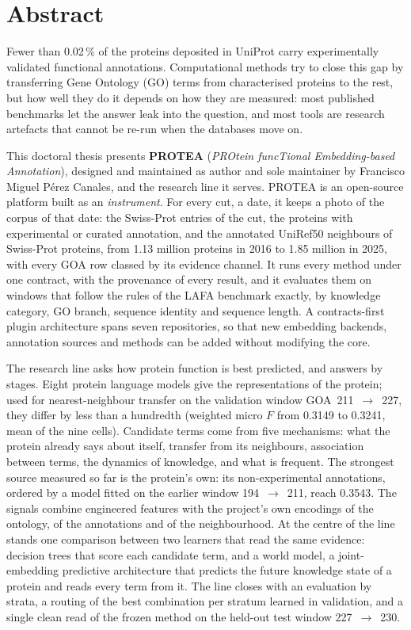 \chapter*{Abstract}

Fewer than 0.02\,\% of the proteins deposited in UniProt carry experimentally
validated functional annotations. Computational methods try to close this gap by
transferring Gene Ontology (GO) terms from characterised proteins to the rest, but how
well they do it depends on how they are measured: most published benchmarks let the
answer leak into the question, and most tools are research artefacts that cannot be
re-run when the databases move on.

This doctoral thesis presents \textbf{PROTEA} (\textit{PROtein funcTional
Embedding-based Annotation}), designed and maintained as author and sole maintainer by
Francisco Miguel P\'{e}rez Canales, and the research line it serves. PROTEA is an
open-source platform built as an \emph{instrument}. For every cut, a date, it keeps a
photo of the corpus of that date: the Swiss-Prot entries of the cut, the proteins with
experimental or curated annotation, and the annotated UniRef50 neighbours of Swiss-Prot
proteins, from 1.13 million proteins in 2016 to 1.85 million in 2025, with every GOA
row classed by its evidence channel. It runs every method under one contract, with the
provenance of every result, and it evaluates them on windows that follow the rules of
the LAFA benchmark exactly, by knowledge category, GO branch, sequence identity and
sequence length. A contracts-first plugin architecture spans seven repositories, so
that new embedding backends, annotation sources and methods can be added without
modifying the core.

The research line asks how protein function is best predicted, and answers by stages.
Eight protein language models give the representations of the protein; used for
nearest-neighbour transfer on the validation window GOA~211~$\to$~227, they differ by
less than a hundredth (weighted micro $F$ from 0.3149 to 0.3241, mean of the nine
cells). Candidate terms come from five mechanisms: what the protein already says about
itself, transfer from its neighbours, association between terms, the dynamics of
knowledge, and what is frequent. The strongest source measured so far is the protein's
own: its non-experimental annotations, ordered by a model fitted on the earlier window
194~$\to$~211, reach 0.3543. The signals combine engineered features with the project's
own encodings of the ontology, of the annotations and of the neighbourhood. At the
centre of the line stands one comparison between two learners that read the same
evidence: decision trees that score each candidate term, and a world model, a
joint-embedding predictive architecture that predicts the future knowledge state of a
protein and reads every term from it. The line closes with an evaluation by strata, a
routing of the best combination per stratum learned in validation, and a single clean
read of the frozen method on the held-out test window 227~$\to$~230.

